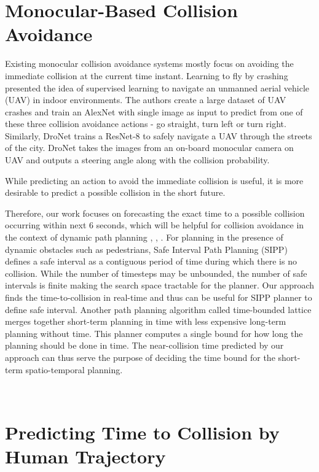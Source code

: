 \noindent
\section{Monocular-Based Collision Avoidance} 

Existing monocular collision avoidance systems mostly focus on avoiding the immediate collision at the current time instant. Learning to fly by crashing \cite{gandhi} presented the idea of supervised learning to navigate an unmanned aerial vehicle (UAV) in indoor environments. The authors create a large dataset of UAV crashes and train an AlexNet \cite{alexnet} with single image as input to predict from one of these three collision avoidance actions - go straight, turn left or turn right. Similarly, DroNet \cite{DroNet} trains a ResNet-8 \cite{resnet} to safely navigate a UAV through the streets of the city.
DroNet takes the images from an on-board monocular camera on UAV and outputs a steering angle along with the collision probability. 

While predicting an action to avoid the immediate collision is useful, it is more desirable to predict a possible collision in the short future.

Therefore, our work focuses on forecasting the exact time to a possible collision occurring within next 6 seconds, which will be helpful for collision avoidance in the context of dynamic path planning \cite{SIPP}, \cite{time-bounded}, \cite{vemula2016path}. For planning in the presence of dynamic obstacles such as pedestrians, Safe Interval Path Planning (SIPP) \cite{SIPP} defines a safe interval as a contiguous period of time during which there is no collision. While the number of timesteps may be unbounded, the number of safe intervals is finite making the search space tractable for the planner. Our approach finds the time-to-collision in real-time and thus can be useful for SIPP planner to define safe interval. Another path planning algorithm called time-bounded lattice \cite{time-bounded} merges together short-term planning in time with less expensive long-term planning without time. This planner computes a single bound for how long the planning should be done in time. The near-collision time predicted by our approach can thus serve the purpose of deciding the time bound for the short-term spatio-temporal planning.    

\noindent\\
\section{Predicting Time to Collision by Human Trajectory}

